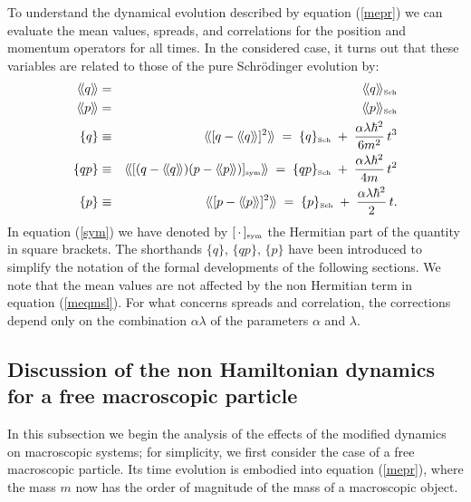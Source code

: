 \documentclass[12pt]{article}
\newcommand{\llangle}{\langle\!\langle}
\newcommand{\rrangle}{\rangle\!\rangle}
\begin{document}
To understand the dynamical evolution described by equation
(\ref{mepr}) we can evaluate the mean values, spreads, and
correlations for the position and momentum operators for all
times. In the considered case, it turns out \cite{grw} that these
variables are related to those of the pure Schr\"odinger evolution
by:
\begin{eqnarray}
\llangle q \rrangle & = & \llangle q \rrangle_{\makebox{\tiny
Sch}} \label{pedc}\\
\llangle p \rrangle & = & \llangle p \rrangle_{\makebox{\tiny
Sch}} \label{pedc2} \\
\{ q \} & \equiv & \llangle [ q - \llangle q \rrangle ]^{2}
\rrangle \; = \; \{ q \}_{\makebox{\tiny Sch}} \; + \;
\frac{\alpha\lambda\hbar^{2}}{6m^{2}}\, t^{3}
\label{pedc3}\\
\{ qp \} & \equiv & \llangle [(q - \llangle q \rrangle) (p -
\llangle p \rrangle)]_{\makebox{\tiny sym}} \rrangle \; = \; \{ qp
\}_{\makebox{\tiny Sch}} \;
+ \; \frac{\alpha\lambda\hbar^{2}}{4m}\, t^{2} \label{sym}\\
\{ p \} & \equiv & \llangle [ p - \llangle p \rrangle ]^{2}
\rrangle \; = \; \{ p \}_{\makebox{\tiny Sch}} \; + \;
\frac{\alpha\lambda\hbar^{2}}{2}\, t. \label{sedc}
\end{eqnarray}
In equation (\ref{sym}) we have denoted by
$[\,\cdot\,]_{\makebox{\tiny sym}}$ the Hermitian part of the
quantity in square brackets. The shorthands $\{ q \}$, $\{ qp \}$,
$\{ p \}$ have been introduced to simplify the notation of the
formal developments of the following sections. We note that the
mean values are not affected by the non Hermitian term in equation
(\ref{meqmsl}). For what concerns spreads and correlation, the
corrections depend only on the combination $\alpha\lambda$ of the
parameters $\alpha$ and $\lambda$.


\subsection[non Hamiltonian dynamics of a free macroscopic
particle]{Discussion of the non Hamiltonian dynamics for a free
macroscopic particle} \label{sec53}

In this subsection we begin the analysis of the effects of the
modified dynamics on macroscopic systems; for simplicity, we first
consider the case of a free macroscopic particle. Its time
evolution is embodied into equation (\ref{mepr}), where the mass
$m$ now has the order of magnitude of the mass of a macroscopic
object.
\end{document}
